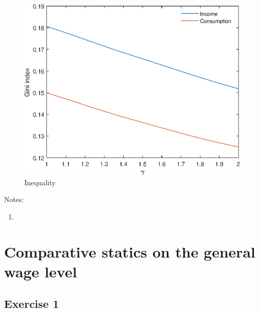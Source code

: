 \documentclass[12pt]{article}
\begin{document}
\begin{figure}
	\centering
	\caption{Inequality}
	\includegraphics{Graphs/ineq_gamma_ex1.eps}
\end{figure}

Notes:

\begin{enumerate}
	\item 
\end{enumerate}

\clearpage

\section{Comparative statics on the general wage level}

\subsection{Exercise 1}
\end{document}
